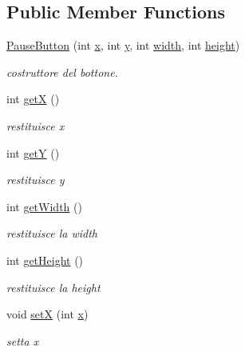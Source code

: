 \subsection*{Public Member Functions}
\begin{DoxyCompactItemize}
\item 
\hyperlink{classui_1_1_pause_button_af569d8cce429cf34c8acdbebf5cadfda}{Pause\+Button} (int \hyperlink{classui_1_1_pause_button_a6150e0515f7202e2fb518f7206ed97dc}{x}, int \hyperlink{classui_1_1_pause_button_a0a2f84ed7838f07779ae24c5a9086d33}{y}, int \hyperlink{classui_1_1_pause_button_a2474a5474cbff19523a51eb1de01cda4}{width}, int \hyperlink{classui_1_1_pause_button_ad12fc34ce789bce6c8a05d8a17138534}{height})
\begin{DoxyCompactList}\small\item\em costruttore del bottone. \end{DoxyCompactList}\item 
int \hyperlink{classui_1_1_pause_button_ae13f88e922e1339355456062ad9fa359}{getX} ()
\begin{DoxyCompactList}\small\item\em restituisce x \end{DoxyCompactList}\item 
int \hyperlink{classui_1_1_pause_button_aab81944f0a14bba932c0931899951937}{getY} ()
\begin{DoxyCompactList}\small\item\em restituisce y \end{DoxyCompactList}\item 
int \hyperlink{classui_1_1_pause_button_a67a0997183f24da19b776d96c1052998}{get\+Width} ()
\begin{DoxyCompactList}\small\item\em restituisce la width \end{DoxyCompactList}\item 
int \hyperlink{classui_1_1_pause_button_a07efb2a4e9a982688c8bb3c3f21d1092}{get\+Height} ()
\begin{DoxyCompactList}\small\item\em restituisce la height \end{DoxyCompactList}\item 
void \hyperlink{classui_1_1_pause_button_add2578ea6b65ad27a905a6d2048748bb}{setX} (int \hyperlink{classui_1_1_pause_button_a6150e0515f7202e2fb518f7206ed97dc}{x})
\begin{DoxyCompactList}\small\item\em setta x \end{DoxyCompactList}\item 

\end{DoxyCompactItemize}
